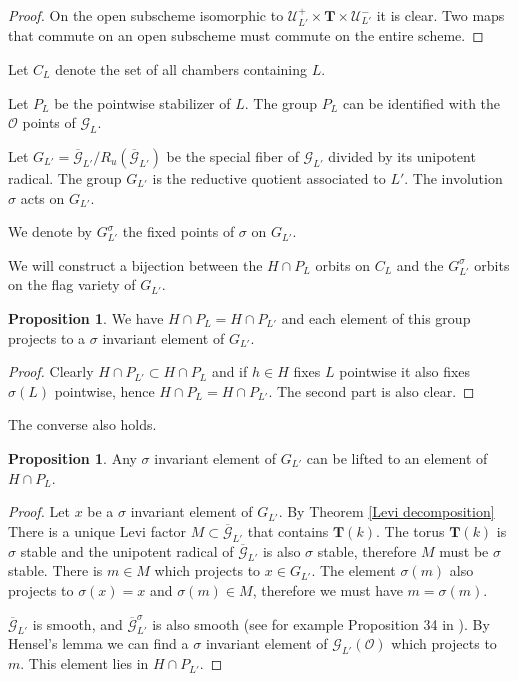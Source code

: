 \documentclass[12pt]{article}
\newcommand{\s}{\mathcal{O}}
\newcommand{\<}{\langle}
\renewcommand{\>}{\rangle}
\theoremstyle{plain}
\theoremstyle{definition}
\newtheorem{prop}[theorem]{Proposition}
\begin{document}
\begin{proof}
    On the open subscheme isomorphic to ${\mathcal U}^+_{L'}\times \mathbf{T}\times {\mathcal U}^-_{L'}$ it is clear. Two maps that commute on an open subscheme must commute on the entire scheme.
\end{proof}

Let $C_L$ denote the set of all chambers containing $L$.

Let $P_L$ be the pointwise stabilizer of $L$. The group $P_L$ can be identified with the $\s$ points of ${\mathcal G}_{L}$.

Let $G_{L'}=\overline{\mathcal G}_{L'}/R_u(\overline{\mathcal G}_{L'})$ be the special fiber of  ${\mathcal G}_{L'}$ divided by its unipotent radical. The group $G_{L'}$ is the reductive quotient associated to $L'$. The involution $\sigma$ acts on $G_{L'}$.

We denote by $G^\sigma_{L'}$ the fixed points of $\sigma$ on $G_{L'}$. 

We will construct a bijection between the $H\cap P_L$ orbits on $C_L$ and the $G^\sigma_{L'}$ orbits on the flag variety of   $G_{L'}$.

\begin{prop}\label{easy direction}
    We have $H\cap P_L=H\cap P_{L'}$ and each element of this group projects to a $\sigma$ invariant element of $G_{L'}$. 
\end{prop}

\begin{proof}
    Clearly $H\cap P_{L'}\subset H\cap P_L$ and if $h\in H$ fixes $L$ pointwise it also fixes $\sigma(L)$ pointwise, hence $H\cap P_L=H\cap P_{L'}$. The second part is also clear.
\end{proof}

The converse also holds.

\begin{prop}\label{ hard direction}
    Any $\sigma$ invariant element of $G_{L'}$ can be lifted to an element of $H\cap P_{L}$.
\end{prop}

\begin{proof}
    Let $x$ be a $\sigma$ invariant element of $G_{L'}$. By Theorem \ref{Levi decomposition} There is a unique Levi factor $M\subset \overline{\mathcal G}_{L'}$ that contains $\mathbf{T}(k)$. The torus $\mathbf{T}(k)$ is $\sigma$ stable and the unipotent radical of $\overline{\mathcal G}_{L'}$ is also $\sigma$ stable, therefore $M$ must be $\sigma$ stable. There is $m\in M$ which projects to $x\in G_{L'}$. The element $\sigma(m)$ also projects to $\sigma(x)=x$ and $\sigma(m)\in M$, therefore we must have $m=\sigma(m)$. 

    $\overline{\mathcal G}_{L'}$ is smooth, and $\overline{\mathcal G}_{L'}^\sigma$ is also smooth (see for example Proposition 34 in \cite{Edixhoven1992}). By Hensel's lemma we can find a $\sigma$ invariant element of ${\mathcal G}_{L'}(\s)$ which projects to $m$. This element lies in $H\cap P_{L'}$. 
    
\end{proof}
\end{document}
